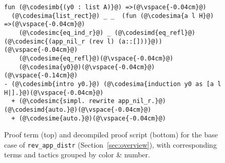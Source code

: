 \begin{figure}
\begin{lstlisting}
fun (@\codesimb{(y0 : list A)}@) =>(@\vspace{-0.04cm}@)
  (@\codesima{list_rect}@) _ _  (fun (@\codesima{a l H}@) =>(@\vspace{-0.04cm}@)
    (@\codesimc{eq_ind_r}@) _ (@\codesimd{eq_refl}@) (@\codesimc{(app_nil_r (rev l) (a::[]))}@))(@\vspace{-0.04cm}@)
    (@\codesime{eq_refl}@)(@\vspace{-0.04cm}@)
    (@\codesima{y0}@)(@\vspace{-0.04cm}@)
(@\vspace{-0.14cm}@)
- (@\codesimb{intro y0.}@) (@\codesima{induction y0 as [a l H|].}@)(@\vspace{-0.04cm}@)
  + (@\codesimc{simpl. rewrite app_nil_r.}@) (@\codesimd{auto.}@)(@\vspace{-0.04cm}@)
  + (@\codesime{auto.}@)(@\vspace{-0.04cm}@)
\end{lstlisting}
\vspace{-0.4cm}
\caption{Proof term (top) and decompiled proof script (bottom) for the base case of 
\lstinline{rev_app_distr} (Section~\ref{sec:overview}), with corresponding terms and tactics 
grouped by color \& number.}
\vspace{-0.25cm}
\label{fig:rainbow}
\end{figure}

